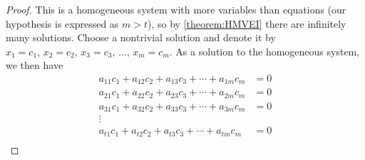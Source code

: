 \documentclass{ximera}
\begin{document}
\begin{theorem}
\begin{proof}
  This is a homogeneous system with more variables than equations (our
  hypothesis is expressed as $m>t$), so by \ref{theorem:HMVEI} there
  are infinitely many solutions.  Choose a nontrivial solution and
  denote it by $x_1=c_1,\,x_2=c_2,\,x_3=c_3,\,\ldots,\,x_m=c_m$.  As a
  solution to the homogeneous system, we then have
  \begin{align*}
    a_{11}c_1+a_{12}c_2+a_{13}c_3+\cdots+a_{1m}c_m&=0\\
    a_{21}c_1+a_{22}c_2+a_{23}c_3+\cdots+a_{2m}c_m&=0\\
    a_{31}c_1+a_{32}c_2+a_{33}c_3+\cdots+a_{3m}c_m&=0\\
    \vdots\quad\quad&\\
    a_{t1}c_1+a_{t2}c_2+a_{t3}c_3+\cdots+a_{tm}c_m&=0\\
  \end{align*}


\end{proof}
\end{theorem}
\end{document}
